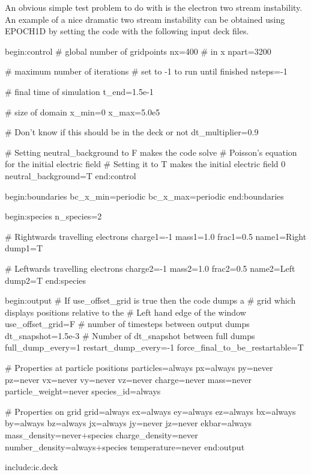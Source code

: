 \documentclass[12pt,a4paper]{article}
\newcommand{\EPOCH}{{\color{warwickdark}\fontfamily{phv}\selectfont{EPOCH}}}
\newenvironment{lboxverbatim}[1]{
\setlength{\FrameSep}{0pt}
\def\FrameCommand{\fboxsep=0pt \colorbox{shadecolor}}
\MakeFramed{\FrameRestore}
\vspace{-13.5pt}
\fvset{label=#1}
\boxverb
}{
\endboxverb
\vspace{-13.5pt}
\endMakeFramed
}
\begin{document}
An obvious simple test problem to do with {\EPOCH} is the electron two stream
instability. An example of a nice dramatic two stream instability can be
obtained using EPOCH1D by setting the code with the following input deck
files.
\begin{lboxverbatim}{input.deck}
begin:control
   # global number of gridpoints
   nx=400 # in x
   npart=3200

   # maximum number of iterations
   # set to -1 to run until finished
   nsteps=-1

   # final time of simulation
   t_end=1.5e-1

   # size of domain
   x_min=0
   x_max=5.0e5

   # Don't know if this should be in the deck or not
   dt_multiplier=0.9

   # Setting neutral_background to F makes the code solve
   # Poisson's equation for the initial electric field
   # Setting it to T makes the initial electric field 0
   neutral_background=T
end:control

begin:boundaries
   bc_x_min=periodic
   bc_x_max=periodic
end:boundaries

begin:species
   n_species=2

   # Rightwards travelling electrons
   charge1=-1
   mass1=1.0
   frac1=0.5
   name1=Right
   dump1=T

   # Leftwards travelling electrons
   charge2=-1
   mass2=1.0
   frac2=0.5
   name2=Left
   dump2=T
end:species

begin:output
   # If use_offset_grid is true then the code dumps a
   # grid which displays positions relative to the
   # Left hand edge of the window
   use_offset_grid=F
   # number of timesteps between output dumps
   dt_snapshot=1.5e-3
   # Number of dt_snapshot between full dumps
   full_dump_every=1
   restart_dump_every=-1
   force_final_to_be_restartable=T

   # Properties at particle positions
   particles=always
   px=always
   py=never
   pz=never
   vx=never
   vy=never
   vz=never
   charge=never
   mass=never
   particle_weight=never
   species_id=always

   # Properties on grid
   grid=always
   ex=always
   ey=always
   ez=always
   bx=always
   by=always
   bz=always
   jx=always
   jy=never
   jz=never
   ekbar=always
   mass_density=never+species
   charge_density=never
   number_density=always+species
   temperature=never
end:output

include:ic.deck
\end{lboxverbatim}
\end{document}
